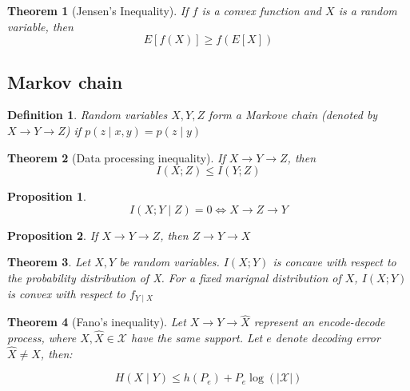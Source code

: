 \documentclass{article}
\newcommand{\norm}[1]{\vert {#1} \vert}
\newtheorem{definition}{Definition}[section]
\newtheorem{theorem}{Theorem}[section]
\newtheorem{proposition}{Proposition}[section]
\begin{document}
    \begin{theorem}[Jensen's Inequality]
        If $f$ is a convex function and $X$ is a random variable, then
        \begin{equation*}
            E[f(X)] \geq f(E[X])
        \end{equation*}
    \end{theorem}

    \subsection{Markov chain}
    \begin{definition}
        Random variables $X, Y, Z$ form a Markove chain (denoted by $X \rightarrow Y \rightarrow Z$) if $p(z \mid x, y) = p(z \mid y)$
    \end{definition}

    \begin{theorem}[Data processing inequality]
        If $X \rightarrow Y \rightarrow Z$, then
        \begin{equation*}
            I(X; Z) \leq I(Y; Z)
        \end{equation*}
    \end{theorem}

    \begin{proposition}
        \begin{equation*}
            I(X; Y \mid Z) = 0 \Leftrightarrow X \rightarrow Z \rightarrow Y
        \end{equation*}
    \end{proposition}

    \begin{proposition}
        If $X \rightarrow Y \rightarrow Z$, then $Z \rightarrow Y \rightarrow X$
    \end{proposition}

    \begin{theorem}
        Let $X, Y$ be random variables. $I(X; Y)$ is concave with respect to the probability distribution of X. For a fixed marignal distribution of $X$, $I(X; Y)$ is convex with respect to $f_{Y \mid X}$
    \end{theorem}

    \begin{theorem}[Fano's inequality]\label{fanos-inequality}
        Let $X \rightarrow Y \rightarrow \hat{X}$ represent an encode-decode process, where $X, \hat{X} \in \mathcal{X}$ have the same support. Let $e$ denote decoding error $\hat{X} \neq X$, then:

        $$
        H(X \mid Y) \leq h(P_e) + P_e \log(\norm{\mathcal{X}})
        $$
    \end{theorem}
\end{document}

